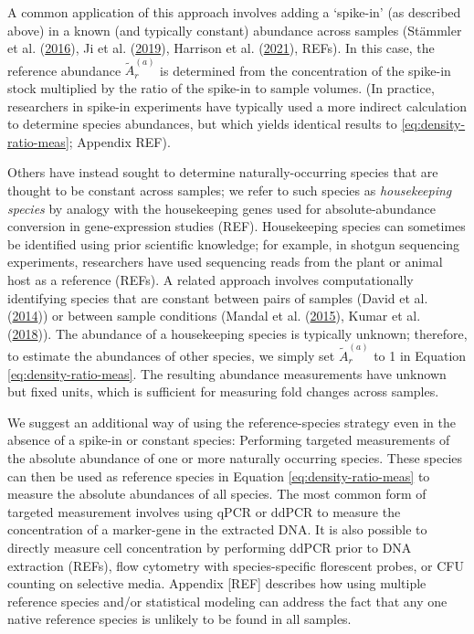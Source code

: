 \documentclass[
]{article}
\begin{document}
A common application of this approach involves adding a `spike-in' (as described above) in a known (and typically constant) abundance across samples (Stämmler et al. (\protect\hyperlink{ref-stammler2016adju}{2016}), Ji et al. (\protect\hyperlink{ref-ji2019quan}{2019}), Harrison et al. (\protect\hyperlink{ref-harrison2021theq}{2021}), REFs).
In this case, the reference abundance \(\tilde A_r^{(a)}\) is determined from the concentration of the spike-in stock multiplied by the ratio of the spike-in to sample volumes.
(In practice, researchers in spike-in experiments have typically used a more indirect calculation to determine species abundances, but which yields identical results to \eqref{eq:density-ratio-meas}; Appendix REF).

Others have instead sought to determine naturally-occurring species that are thought to be constant across samples; we refer to such species as \emph{housekeeping species} by analogy with the housekeeping genes used for absolute-abundance conversion in gene-expression studies (REF).
Housekeeping species can sometimes be identified using prior scientific knowledge; for example, in shotgun sequencing experiments, researchers have used sequencing reads from the plant or animal host as a reference (REFs).
A related approach involves computationally identifying species that are constant between pairs of samples (David et al. (\protect\hyperlink{ref-david2014host}{2014})) or between sample conditions (Mandal et al. (\protect\hyperlink{ref-mandal2015anal}{2015}), Kumar et al. (\protect\hyperlink{ref-kumar2018anal}{2018})).
The abundance of a housekeeping species is typically unknown; therefore, to estimate the abundances of other species, we simply set \(\tilde A_r^{(a)}\) to 1 in Equation \eqref{eq:density-ratio-meas}.
The resulting abundance measurements have unknown but fixed units, which is sufficient for measuring fold changes across samples.

We suggest an additional way of using the reference-species strategy even in the absence of a spike-in or constant species:
Performing targeted measurements of the absolute abundance of one or more naturally occurring species.
These species can then be used as reference species in Equation \eqref{eq:density-ratio-meas} to measure the absolute abundances of all species.
The most common form of targeted measurement involves using qPCR or ddPCR to measure the concentration of a marker-gene in the extracted DNA.
It is also possible to directly measure cell concentration by performing ddPCR prior to DNA extraction (REFs), flow cytometry with species-specific florescent probes, or CFU counting on selective media.
Appendix {[}REF{]} describes how using multiple reference species and/or statistical modeling can address the fact that any one native reference species is unlikely to be found in all samples.
\end{document}
